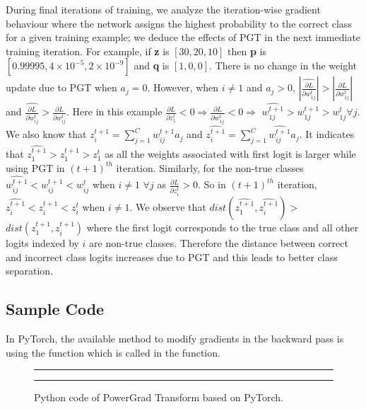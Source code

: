 \documentclass[runningheads]{llncs}
\begin{document}
During final iterations of training, we analyze the iteration-wise gradient behaviour
where the network assigns the highest probability to the correct class for a given
training example; we deduce the effects of PGT in the next immediate training iteration.
For example, if \textbf{z} is $[30, 20, 10]$ then \textbf{p} is $[0.99995, 4\times
10^{-5}, 2\times10^{-9}]$ and \textbf{q} is $[1, 0, 0]$. There is no change in the
weight update due to PGT when $a_j = 0$. However, when $i \neq 1$ and $a_j > 0$,
$|\widehat{\frac{\partial L}{\partial w_{1j}^{t}}}| > |\frac{\partial L}{\partial
w_{1j}^{t}}|$ and $\widehat{\frac{\partial L}{\partial w_{ij}^{t}}} > \frac{\partial
L}{\partial w_{ij}^{t}}$. Here in this example $\frac{\partial L}{\partial z_{1}^{t}} <
0 \Rightarrow \frac{\partial L}{\partial w_{1j}^{t}} < 0 \Rightarrow$
$\widehat{w_{1j}^{t+1}} > w_{1j}^{t+1} > w_{1j}^{t} \forall j$. We also know that
$z_i^{t+1} = \sum_{j=1}^{C}w_{ij}^{t+1}a_j$ and $\widehat{z_i^{t+1}} =
\sum_{j=1}^{C}\widehat{w_{ij}^{t+1}}a_j$. It indicates that $\widehat{z_{1}^{t+1}} >
z_{1}^{t+1} > z_{1}^{t}$ as all the weights associated with first logit is larger while
using PGT in $(t+1)^{th}$ iteration. Similarly, for the non-true classes
$\widehat{w_{ij}^{t+1}} < w_{ij}^{t+1} < w_{ij}^{t}$ when $i \neq 1$ $\forall j$ as
$\frac{\partial L}{\partial z_{i}^{t}} > 0$. So in $(t+1)^{th}$ iteration,
$\widehat{z_{i}^{t+1}} < z_{i}^{t+1} < z_{i}^{t}$ when $i \neq 1$. We observe that
$dist(\widehat{z_{1}^{t+1}}, \widehat{z_{i}^{t+1}}) > $  $dist(z_{1}^{t+1},
z_{i}^{t+1})$ where the first logit corresponds to the true class and all other logits
indexed by $i$ are non-true classes. Therefore the distance between correct and
incorrect class logits increases due to PGT and this leads to better class separation.

\clearpage

\subsection{Sample Code}

In PyTorch, the available method to modify gradients in the backward pass is using the
 function which is called in the  function.

\begin{figure}[ht] \hrule  \hrule
\vspace{0.25cm} \caption{Python code of PowerGrad Transform based on PyTorch. }
\label{fig:code}
\end{figure}
\end{document}
